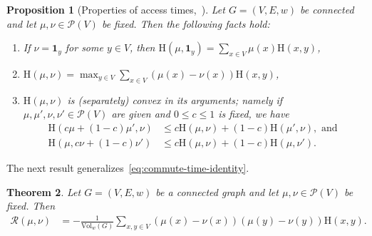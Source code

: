 \documentclass[11pt,a4paper]{article}
\newcommand{\Resis}{\mathcal{R}}
\newcommand{\Prob}{\mathscr{P}}
\newcommand{\Hitting}{\mathrm{H}}
\newtheorem{theorem}{Theorem}[section]
\newtheorem{proposition}[theorem]{Proposition}
\begin{document}
\begin{proposition}[Properties of access times,~\cite{lovasz1995mixing}]\label{prop:access-time-properties}
    Let $G=(V,E, w)$ be connected and let $\mu,\nu\in\Prob(V)$ be fixed. Then the following facts hold:
        \begin{enumerate}[label=(\roman*)]
            \item If $\nu = \mathbf{1}_y$ for some $y\in V$, then $\Hitting(\mu,\mathbf{1}_y) = \sum_{x\in V}\mu(x) \Hitting(x, y)$,
            \item $\Hitting(\mu,\nu) = \max_{y\in V}\sum_{x\in V} (\mu(x)-\nu(x)) \Hitting(x, y)$,
            \item $\Hitting(\mu,\nu)$ is (separately) convex in its arguments; namely if $\mu,\mu', \nu,\nu'\in\Prob(V)$ are given and $0\le c \le 1$ is fixed, we have
                \begin{align}
                    \Hitting(c \mu + (1-c)\mu', \nu) &\leq c\Hitting(\mu, \nu) + (1-c)\Hitting(\mu', \nu),\text{ and }\\
                    \Hitting(\mu, c \nu + (1-c)\nu' )&\leq c\Hitting(\mu,\nu) + (1-c)\Hitting(\mu, \nu').
                \end{align}
        \end{enumerate}
\end{proposition}

The next result generalizes~\cref{eq:commute-time-identity}.

\begin{theorem}\label{thm:resistance-access-time}
    Let $G=(V,E, w)$ be a connected graph and let $\mu,\nu\in\Prob(V)$ be fixed. Then 
        \begin{align}\label{eq:resistance-access-time}
            \Resis(\mu,\nu) &= -\frac{1}{\mathrm{Vol}_w(G)} \sum_{x, y\in V}(\mu(x) - \nu(x)) (\mu(y) - \nu(y)) \Hitting(x, y).
        \end{align}
\end{theorem}
\end{document}
